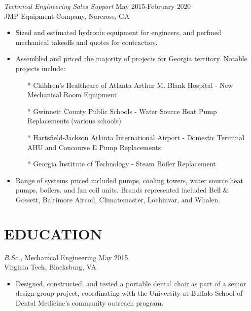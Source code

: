 \documentclass[margin]{res}
\begin{document}
\begin{resume}
    {\sl Technical Engineering Sales Support} \hfill May 2015-February 2020 \\
        JMP Equipment Company, Norcross, GA
        \begin{itemize}  \itemsep -2pt %
            \item Sized and estimated hydronic equipment for engineers, and perfmed mechanical takeoffs and quotes for contractors.
            \item Assembled and priced the majority of projects for Georgia territory. Notable projects include:
              \begin{itemize}
              \item[*] Children's Healthcare of Atlanta Arthur M. Blank Hospital - New Mechanical Room Equipment
              \item[*] Gwinnett County Public Schools - Water Source Heat Pump Replacements (various schools)
              \item[*] Hartsfield-Jackson Atlanta International Airport - Domestic Terminal AHU and Concourse E Pump Replacements
              \item[*] Georgia Institute of Technology - Steam Boiler Replacement
              \end{itemize}
            \item Range of systems priced included pumps, cooling towers, water source heat pumps, boilers, and fan coil units. Brands represented included Bell \& Gossett, Baltimore Aircoil, Climatemaster, Lochinvar, and Whalen.
            \end{itemize}
 

\section{EDUCATION} {\sl B.Sc.,} Mechanical Engineering \hfill  May 2015 \\
    Virginia Tech, Blacksburg, VA
    \begin{itemize}  \itemsep -2pt %
        \item Designed, constructed, and tested a portable dental chair as part of a senior design group project, coordinating with the University at Buffalo School of Dental Medicine's community outreach program.
    \end{itemize}


\end{resume}
\end{document}
